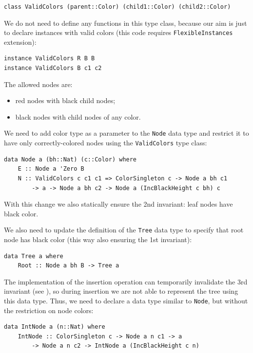 \documentclass{tmr}
\begin{document}
\begin{Verbatim}
class ValidColors (parent::Color) (child1::Color) (child2::Color)
\end{Verbatim}

We do not need to define any functions in this type class, because our aim is just to declare instances with valid colors (this code requires \verb|FlexibleInstances| extension):

\begin{Verbatim}
instance ValidColors R B B
instance ValidColors B c1 c2
\end{Verbatim}

The allowed nodes are:

\begin{itemize}
\item red nodes with black child nodes;
\item black nodes with child nodes of any color.
\end{itemize}

We need to add color type as a parameter to the \verb|Node| data type and restrict it to have only correctly-colored nodes using the \verb|ValidColors| type class:

\begin{Verbatim}
data Node a (bh::Nat) (c::Color) where
    E :: Node a 'Zero B
    N :: ValidColors c c1 c1 => ColorSingleton c -> Node a bh c1
        -> a -> Node a bh c2 -> Node a (IncBlackHeight c bh) c
\end{Verbatim}

With this change we also statically ensure the 2nd invariant: leaf nodes have black color.

We also need to update the definition of the \verb|Tree| data type to specify that root node has black color (this way also ensuring the 1st invariant):

\begin{Verbatim}
data Tree a where
    Root :: Node a bh B -> Tree a
\end{Verbatim}

The implementation of the insertion operation can temporarily invalidate the 3rd invariant (see ), so during insertion we are not able to represent the tree using this data type. Thus, we need to declare a data type similar to \verb|Node|, but without the restriction on node colors:

\begin{Verbatim}
data IntNode a (n::Nat) where
    IntNode :: ColorSingleton c -> Node a n c1 -> a
        -> Node a n c2 -> IntNode a (IncBlackHeight c n)
\end{Verbatim}
\end{document}
